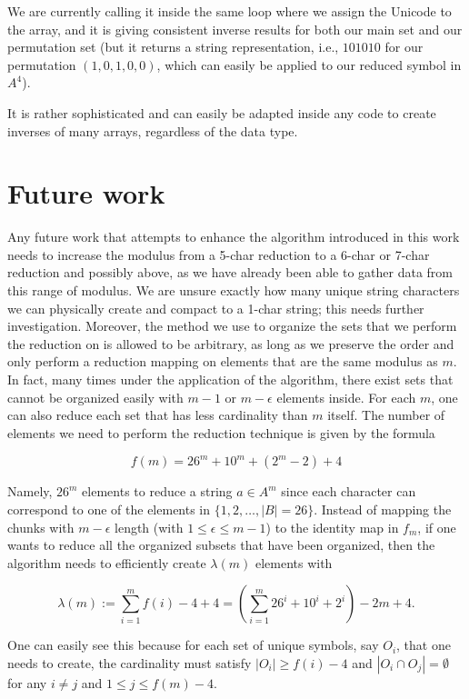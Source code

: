 \documentclass[amsmath,12pt,a4paper]{amsart}
\begin{document}
We are currently calling it inside the same loop where we assign the Unicode to the array, and it is giving consistent inverse results for both our main set and our permutation set (but it returns a string representation, i.e., \( 101010 \) for our permutation \( (1, 0, 1, 0, 0) \), which can easily be applied to our reduced symbol in \( A^4 \)). 

It is rather sophisticated and can easily be adapted inside any code to create inverses of many arrays, regardless of the data type.

\section{Future work}

Any future work that attempts to enhance the algorithm introduced in this work needs to increase the modulus from a 5-char reduction to a 6-char or 7-char reduction and possibly above, as we have already been able to gather data from this range of modulus. We are unsure exactly how many unique string characters we can physically create and compact to a 1-char string; this needs further investigation. Moreover, the method we use to organize the sets that we perform the reduction on is allowed to be arbitrary, as long as we preserve the order and only perform a reduction mapping on elements that are the same modulus as \( m \). In fact, many times under the application of the algorithm, there exist sets that cannot be organized easily with \( m - 1 \) or \( m - \epsilon \) elements inside. For each \( m \), one can also reduce each set that has less cardinality than \( m \) itself. The number of elements we need to perform the reduction technique is given by the formula

\[
f(m) = 26^m + 10^m + (2^m - 2) + 4
\]

Namely, \( 26^m \) elements to reduce a string \( a \in A^m \) since each character can correspond to one of the elements in \( \{1, 2, \ldots, |B| = 26\} \). Instead of mapping the chunks with \( m - \epsilon \) length (with \( 1 \leq \epsilon \leq m - 1 \)) to the identity map in \( f_m \), if one wants to reduce all the organized subsets that have been organized, then the algorithm needs to efficiently create \( \lambda(m) \) elements with

\[
\lambda(m) := \sum_{i=1}^{m} f(i) - 4 + 4 = \left( \sum_{i=1}^{m} 26^i + 10^i + 2^i \right) - 2m + 4.
\]

One can easily see this because for each set of unique symbols, say \( O_i \), that one needs to create, the cardinality must satisfy \( |O_i| \geq f(i) - 4 \) and \( |O_i \cap O_j| = \emptyset \) for any \( i \neq j \) and \( 1 \leq j \leq f(m) - 4 \). 
\end{document}
